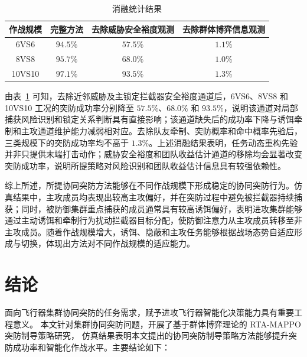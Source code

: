 \begin{table}[H]
  \centering
  \caption{消融统计结果}
  \label{tab:ablation-rta-prior}
  \begin{tabular}{cccc}
    \toprule
    作战规模 & 完整方法 & 去除威胁安全裕度观测 & 去除群体博弈信息观测  \\
    \midrule
    6VS6   & $94.5\%$  & $57.5\%$  & $1.1\%$    \\
    8VS8   & $95.7\%$ & $68.0\%$ & $1.0\%$   \\
    10VS10 & $97.1\%$ & $93.5\%$   & $1.3\%$  \\
    \bottomrule
  \end{tabular}
\end{table}

由表~\ref{tab:ablation-rta-prior} 可知，去除近邻威胁及主锁定拦截器安全裕度通道后，6VS6、8VS8 和 10VS10 工况的突防成功率分别降至 $57.5\%$、$68.0\%$ 和 $93.5\%$，说明该通道对局部捕获风险识别和锁定关系判断具有直接影响；该通道缺失后的成功率下降与诱饵牵制和主攻通道维护能力减弱相对应。去除队友牵制、突防概率和命中概率先验后，三类规模下的突防成功率均不高于 $1.3\%$。上述消融结果表明，任务动态重构先验并非只提供末端打击动作；威胁安全裕度和团队收益估计通道的移除均会显著改变突防成功率，说明所提策略对风险识别和团队收益估计信息具有较强依赖性。


综上所述，所提协同突防方法能够在不同作战规模下形成稳定的协同突防行为。仿真结果中，主攻成员均表现出较高主攻偏好，并在突防过程中避免被拦截器持续捕获；同时，被防御集群重点捕获的成员通常具有较高诱饵偏好，表明进攻集群能够通过主动诱饵和牵制行为扰动拦截器目标分配，使防御注意力从主攻成员转移至非主攻成员。随着作战规模增大，诱饵、隐蔽和主攻任务能够根据战场态势自适应形成与切换，体现出方法对不同作战规模的适应能力。


\section{结论}
\label{sec:conclusion}

面向飞行器集群协同突防的任务需求，赋予进攻飞行器智能化决策能力具有重要工程意义。
本文针对集群协同突防问题，开展了基于群体博弈理论的 RTA-MAPPO 突防制导策略研究，
仿真结果表明本文提出的协同突防制导策略方法能够提升突防成功率和智能化作战水平。主要结论如下：

